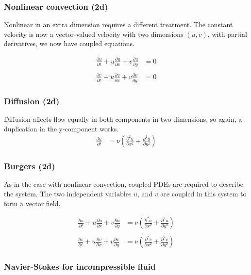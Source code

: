 \documentclass[11pt]{article}
\begin{document}
\subsubsection{Nonlinear convection (2d)}
Nonlinear in an extra dimension requires a different treatment.
The constant velocity is now a vector-valued velocity with two dimensions
$(u, v)$, with partial derivatives, we now have coupled equations.

\begin{align}
\frac{\partial u}{\partial t} + u\frac{\partial u}{\partial x}  + v\frac{\partial u}{\partial y} 
&= 0		\nonumber \\ \nonumber\\
\frac{\partial v}{\partial t} + u\frac{\partial v}{\partial x}  + v\frac{\partial v}{\partial y} 
&= 0
	\label{2d_nonlinconv}
\end{align}

\subsubsection{Diffusion (2d)}
Diffusion affects flow equally in both components in two dimensions, so
again, a duplication in the y-component works.
\begin{align}
\frac{\partial u}{\partial t} &= \nu \left(\frac{\partial^2 u}{\partial x^2} + \frac{\partial^2 u}{\partial y^2}\right)		\label{2d_diffusion}
\end{align}

\subsubsection{Burgers (2d)}
As in the case with nonlinear convection, coupled PDEs are required to
describe the system. The two independent variables $u$, and $v$ are coupled
in this system to form a vector field.

\begin{align}
\frac{\partial u}{\partial t} + u \frac{\partial u}{\partial x} + v \frac{\partial u}{\partial y}
&= \nu \left(\frac{\partial^2 u}{\partial x^2} + \frac{\partial^2 u}{\partial y^2}\right)
\nonumber \\ \nonumber \\
\frac{\partial v}{\partial t} + u \frac{\partial v}{\partial x} + v \frac{\partial v}{\partial y}
&= \nu \left(\frac{\partial^2 v}{\partial x^2} + \frac{\partial^2 v}{\partial y^2}\right)	\label{2d_Burgers}
\end{align}

\subsubsection{Navier-Stokes for incompressible fluid}
\end{document}
